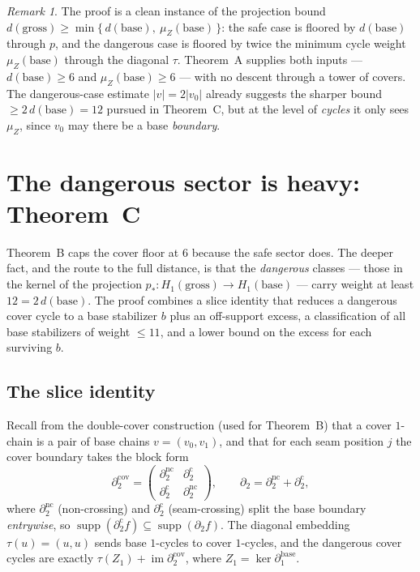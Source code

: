 \documentclass[11pt]{article}
\newcommand{\wt}[1]{\lvert #1\rvert}
\DeclareMathOperator{\img}{im}
\DeclareMathOperator{\supp}{supp}
\newcommand{\dcut}{\partial_2^{\mathrm{c}}}     %
\newcommand{\dncut}{\partial_2^{\mathrm{nc}}}   %
\theoremstyle{plain}
\theoremstyle{definition}
\theoremstyle{remark}
\newtheorem*{remark}{Remark}
\begin{document}
\begin{remark}
The proof is a clean instance of the projection bound
$d(\mathrm{gross})\ge\min\{\,d(\mathrm{base}),\ \mu_Z(\mathrm{base})\,\}$: the safe case is
floored by $d(\mathrm{base})$ through $p$, and the dangerous case is floored by twice the
minimum cycle weight $\mu_Z(\mathrm{base})$ through the diagonal $\tau$. Theorem~A supplies
both inputs --- $d(\mathrm{base})\ge 6$ and $\mu_Z(\mathrm{base})\ge 6$ --- with no descent
through a tower of covers. The dangerous-case estimate $\wt{v}=2\wt{v_0}$ already suggests
the sharper bound $\ge 2\,d(\mathrm{base})=12$ pursued in Theorem~C, but at the level of
\emph{cycles} it only sees $\mu_Z$, since $v_0$ may there be a base \emph{boundary}.
\end{remark}
\section{The dangerous sector is heavy: Theorem~C}\label{sec:thmC}

Theorem~B caps the cover floor at $6$ because the safe sector does. The deeper fact,
and the route to the full distance, is that the \emph{dangerous} classes --- those in
the kernel of the projection $p_\ast\colon H_1(\mathrm{gross})\to H_1(\mathrm{base})$
--- carry weight at least $12=2\,d(\mathrm{base})$. The proof combines a slice identity
that reduces a dangerous cover cycle to a base stabilizer $b$ plus an off-support
excess, a classification of all base stabilizers of weight $\le 11$, and a lower bound
on the excess for each surviving $b$.

\subsection{The slice identity}\label{subsec:slice}

Recall from the double-cover construction (used for Theorem~B) that a cover $1$-chain is
a pair of base chains $v=(v_0,v_1)$, and that for each seam position $j$ the cover
boundary takes the block form
\[
  \partial_2^{\mathrm{cov}}=
  \begin{pmatrix}\dncut & \dcut\\[2pt]\dcut & \dncut\end{pmatrix},
  \qquad \partial_2=\dncut+\dcut,
\]
where $\dncut$ (non-crossing) and $\dcut$ (seam-crossing) split the base boundary
\emph{entrywise}, so $\supp(\dcut f)\subseteq\supp(\partial_2 f)$. The diagonal
embedding $\tau(u)=(u,u)$ sends base $1$-cycles to cover $1$-cycles, and the dangerous
cover cycles are exactly $\tau(Z_1)+\img\partial_2^{\mathrm{cov}}$, where $Z_1=\ker
\partial_1^{\mathrm{base}}$.
\end{document}
